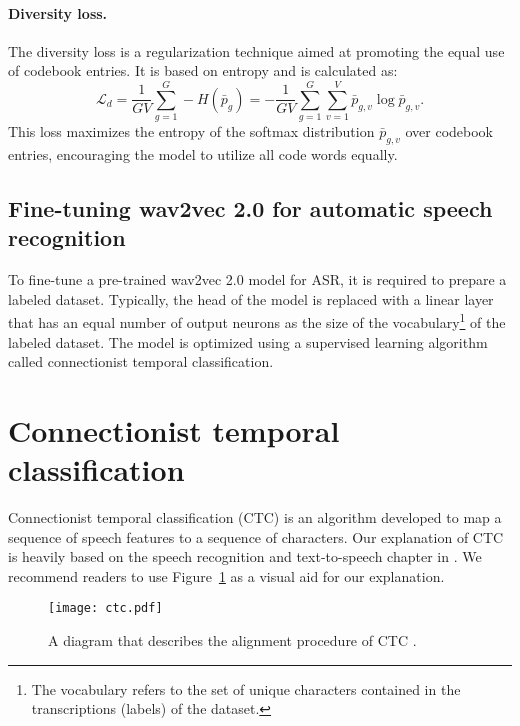 \paragraph*{Diversity loss.}
The diversity loss is a regularization technique aimed at promoting the equal use of codebook entries. 
It is based on entropy and is calculated as:
\begin{equation}
    \mathcal{L}_d = \dfrac{1}{GV}\sum_{g=1}^{G} -H(\bar{p}_{g}) = -\dfrac{1}{GV}\sum_{g=1}^{G} \sum_{v=1}^{V} \bar{p}_{g,v} \log \bar{p}_{g,v}.
\end{equation}
This loss maximizes the entropy of the softmax distribution $\bar{p}_{g,v}$ over codebook entries, encouraging the model to utilize all code words equally.

\subsection{Fine-tuning wav2vec 2.0 for automatic speech recognition}\label{subsec:finetune}
To fine-tune a pre-trained wav2vec 2.0 model for ASR, it is required to prepare a labeled dataset.
Typically, the head of the model is replaced with a linear layer that has an equal number of output neurons as the size of the vocabulary\footnote{The vocabulary refers to the set of unique characters contained in the transcriptions (labels) of the dataset.} of the labeled dataset.
The model is optimized using a supervised learning algorithm called connectionist temporal classification.

\section{Connectionist temporal classification}\label{sec:ctc}
Connectionist temporal classification (CTC) \cite{graves2006connectionist} is an algorithm 
developed to map a sequence of speech features to a sequence of characters.
Our explanation of CTC is heavily based on the speech recognition and text-to-speech chapter in \cite{jurafskyspeech}.
We recommend readers to use Figure~\ref{ctc} as a visual aid for our explanation.

\begin{figure}
    \centering
    \captionsetup{justification=centering}
    \texttt{[image: ctc.pdf]}
    \caption{A diagram that describes the alignment procedure of CTC \cite{jurafskyspeech}.}
    \label{ctc}
\end{figure}

